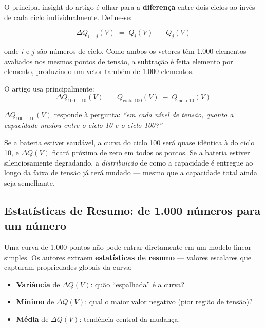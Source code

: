 \documentclass[12pt,a4paper]{article}
\begin{document}
O principal insight do artigo \'{e} olhar para a \textbf{diferen\c{c}a} entre
dois ciclos ao inv\'{e}s de cada ciclo individualmente. Define-se:

\begin{equation}
  \Delta Q_{i-j}(V) \;=\; Q_i(V) \;-\; Q_j(V)
\end{equation}

onde $i$ e $j$ s\~ao n\'{u}meros de ciclo. Como ambos os vetores t\^{e}m 1.000
elementos avaliados nos mesmos pontos de tens\~ao, a subtra\c{c}\~ao \'{e} feita
elemento por elemento, produzindo um vetor tamb\'{e}m de 1.000 elementos.

O artigo usa principalmente:
\begin{equation}
  \Delta Q_{100-10}(V) \;=\; Q_{\text{ciclo 100}}(V) \;-\; Q_{\text{ciclo 10}}(V)
\end{equation}

\begin{atencao}
$\Delta Q_{100-10}(V)$ responde \`{a} pergunta: \textit{``em cada n\'{i}vel de tens\~ao,
quanto a capacidade mudou entre o ciclo 10 e o ciclo 100?''}

Se a bateria estiver saud\'{a}vel, a curva do ciclo 100 ser\'{a} quase id\^{e}ntica
\`{a} do ciclo 10, e $\Delta Q(V)$ ficar\'{a} pr\'{o}xima de zero em todos os pontos.
Se a bateria estiver silenciosamente degradando, a \textit{distribui\c{c}\~ao}
de como a capacidade \'{e} entregue ao longo da faixa de tens\~ao j\'{a} ter\'{a}
mudado --- mesmo que a capacidade total ainda seja semelhante.
\end{atencao}

\subsection{Estat\'{i}sticas de Resumo: de 1.000 n\'{u}meros para um n\'{u}mero}

Uma curva de 1.000 pontos n\~ao pode entrar diretamente em um modelo linear
simples. Os autores extraem \textbf{estat\'{i}sticas de resumo} --- valores escalares
que capturam propriedades globais da curva:

\begin{itemize}
  \item \textbf{Vari\^{a}ncia} de $\Delta Q(V)$: qu\~ao ``espalhada'' \'{e} a curva?
  \item \textbf{M\'{i}nimo} de $\Delta Q(V)$: qual o maior valor negativo (pior regi\~ao
    de tens\~ao)?
  \item \textbf{M\'{e}dia} de $\Delta Q(V)$: tend\^{e}ncia central da mudan\c{c}a.
\end{itemize}
\end{document}
